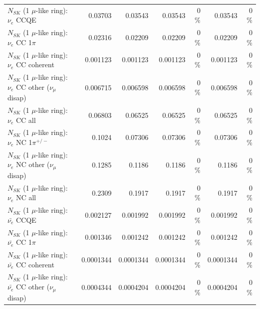 \begin{table}
\begin{tabular}{| l | r | r | r  r | r  r |}
\hline
\hline
\hline
                                      $N_{SK}$ (1 $\mu$-like ring): $\nu_e$ CCQE &         0.03703 &         0.03543 &         0.03543 &        0 \%  &         0.03543 &        0 \%  \\ 
                                 $N_{SK}$ (1 $\mu$-like ring): $\nu_e$ CC 1$\pi$ &         0.02316 &         0.02209 &         0.02209 &        0 \%  &         0.02209 &        0 \%  \\ 
                               $N_{SK}$ (1 $\mu$-like ring): $\nu_e$ CC coherent &        0.001123 &        0.001123 &        0.001123 &        0 \%  &        0.001123 &        0 \%  \\ 
                $N_{SK}$ (1 $\mu$-like ring): $\nu_e$ CC other ($\nu_\mu$ disap) &        0.006715 &        0.006598 &        0.006598 &        0 \%  &        0.006598 &        0 \%  \\ 
                                  $N_{SK}$ (1 $\mu$-like ring): $\nu_{e}$ CC all &         0.06803 &         0.06525 &         0.06525 &        0 \%  &         0.06525 &        0 \%  \\ 
\hline
                           $N_{SK}$ (1 $\mu$-like ring): $\nu_e$ NC 1$\pi^{+/-}$ &          0.1024 &         0.07306 &         0.07306 &        0 \%  &         0.07306 &        0 \%  \\ 
                $N_{SK}$ (1 $\mu$-like ring): $\nu_e$ NC other ($\nu_\mu$ disap) &          0.1285 &          0.1186 &          0.1186 &        0 \%  &          0.1186 &        0 \%  \\ 
                                  $N_{SK}$ (1 $\mu$-like ring): $\nu_{e}$ NC all &          0.2309 &          0.1917 &          0.1917 &        0 \%  &          0.1917 &        0 \%  \\ 
\hline
\hline
\hline
                                $N_{SK}$ (1 $\mu$-like ring): $\bar{\nu_e}$ CCQE &        0.002127 &        0.001992 &        0.001992 &        0 \%  &        0.001992 &        0 \%  \\ 
                           $N_{SK}$ (1 $\mu$-like ring): $\bar{\nu_e}$ CC 1$\pi$ &        0.001346 &        0.001242 &        0.001242 &        0 \%  &        0.001242 &        0 \%  \\ 
                         $N_{SK}$ (1 $\mu$-like ring): $\bar{\nu_e}$ CC coherent &       0.0001344 &       0.0001344 &       0.0001344 &        0 \%  &       0.0001344 &        0 \%  \\ 
          $N_{SK}$ (1 $\mu$-like ring): $\bar{\nu_e}$ CC other ($\nu_\mu$ disap) &       0.0004344 &       0.0004204 &       0.0004204 &        0 \%  &       0.0004204 &        0 \%  \\ 

\end{tabular}
\end{table}
